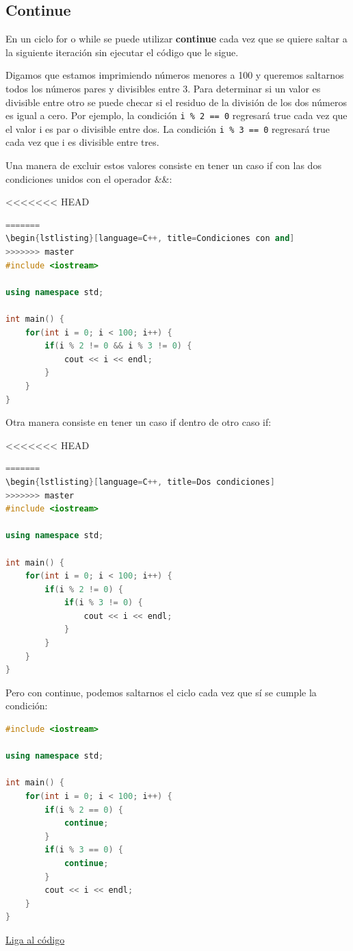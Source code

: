 \documentclass{article}
\begin{document}
\subsection{Continue}

En un ciclo for o while se puede utilizar \textbf{continue} cada vez que se quiere saltar a la siguiente iteración sin ejecutar el código que le sigue.

Digamos que estamos imprimiendo números menores a 100 y queremos saltarnos todos los números pares y divisibles entre 3. Para determinar si un valor es divisible entre otro se puede checar si el residuo de la división de los dos números es igual a cero. Por ejemplo, la condición \lstinline{i % 2 == 0} regresará true cada vez que el valor i es par o divisible entre dos. La condición \lstinline{i % 3 == 0} regresará true cada vez que i es divisible entre tres.

Una manera de excluir estos valores consiste en tener un caso if con las dos condiciones unidos con el operador \&\&:

<<<<<<< HEAD
\begin{lstlisting}[language=C++, title=Condiciones con AND]
=======
\begin{lstlisting}[language=C++, title=Condiciones con and]
>>>>>>> master
#include <iostream>

using namespace std;

int main() {
	for(int i = 0; i < 100; i++) {
		if(i % 2 != 0 && i % 3 != 0) {
			cout << i << endl;
		}
	}
}
\end{lstlisting}

Otra manera consiste en tener un caso if dentro de otro caso if:

<<<<<<< HEAD
\begin{lstlisting}[language=C++, title=Condiciones anidados]
=======
\begin{lstlisting}[language=C++, title=Dos condiciones]
>>>>>>> master
#include <iostream>

using namespace std;

int main() {
	for(int i = 0; i < 100; i++) {
		if(i % 2 != 0) {
			if(i % 3 != 0) {
				cout << i << endl;
			}
		}
	}
}
\end{lstlisting}

Pero con continue, podemos saltarnos el ciclo cada vez que sí se cumple la condición:

\begin{lstlisting}[language=C++, title=Continue]
#include <iostream>

using namespace std;

int main() {
	for(int i = 0; i < 100; i++) {
		if(i % 2 == 0) {
			continue;
		}
		if(i % 3 == 0) {
			continue;
		}
		cout << i << endl;
	}
}
\end{lstlisting}
\href{https://repl.it/@Jamesscn/Numeros-no-hexagonales}{Liga al código}\\
\end{document}
